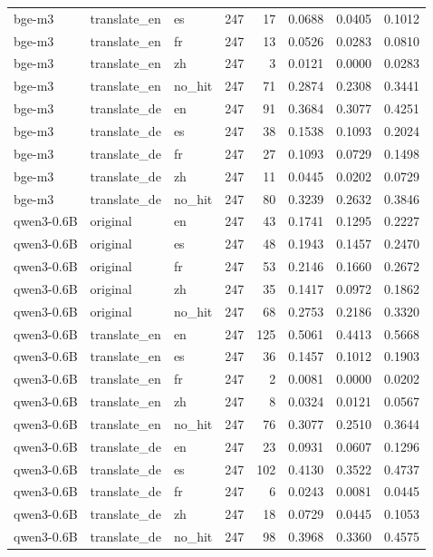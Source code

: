 \begin{tabular}{lllrrrrr}
bge-m3 & translate\_en & es & 247 & 17 & 0.0688 & 0.0405 & 0.1012 \\
bge-m3 & translate\_en & fr & 247 & 13 & 0.0526 & 0.0283 & 0.0810 \\
bge-m3 & translate\_en & zh & 247 & 3 & 0.0121 & 0.0000 & 0.0283 \\
bge-m3 & translate\_en & no\_hit & 247 & 71 & 0.2874 & 0.2308 & 0.3441 \\
bge-m3 & translate\_de & en & 247 & 91 & 0.3684 & 0.3077 & 0.4251 \\
bge-m3 & translate\_de & es & 247 & 38 & 0.1538 & 0.1093 & 0.2024 \\
bge-m3 & translate\_de & fr & 247 & 27 & 0.1093 & 0.0729 & 0.1498 \\
bge-m3 & translate\_de & zh & 247 & 11 & 0.0445 & 0.0202 & 0.0729 \\
bge-m3 & translate\_de & no\_hit & 247 & 80 & 0.3239 & 0.2632 & 0.3846 \\
qwen3-0.6B & original & en & 247 & 43 & 0.1741 & 0.1295 & 0.2227 \\
qwen3-0.6B & original & es & 247 & 48 & 0.1943 & 0.1457 & 0.2470 \\
qwen3-0.6B & original & fr & 247 & 53 & 0.2146 & 0.1660 & 0.2672 \\
qwen3-0.6B & original & zh & 247 & 35 & 0.1417 & 0.0972 & 0.1862 \\
qwen3-0.6B & original & no\_hit & 247 & 68 & 0.2753 & 0.2186 & 0.3320 \\
qwen3-0.6B & translate\_en & en & 247 & 125 & 0.5061 & 0.4413 & 0.5668 \\
qwen3-0.6B & translate\_en & es & 247 & 36 & 0.1457 & 0.1012 & 0.1903 \\
qwen3-0.6B & translate\_en & fr & 247 & 2 & 0.0081 & 0.0000 & 0.0202 \\
qwen3-0.6B & translate\_en & zh & 247 & 8 & 0.0324 & 0.0121 & 0.0567 \\
qwen3-0.6B & translate\_en & no\_hit & 247 & 76 & 0.3077 & 0.2510 & 0.3644 \\
qwen3-0.6B & translate\_de & en & 247 & 23 & 0.0931 & 0.0607 & 0.1296 \\
qwen3-0.6B & translate\_de & es & 247 & 102 & 0.4130 & 0.3522 & 0.4737 \\
qwen3-0.6B & translate\_de & fr & 247 & 6 & 0.0243 & 0.0081 & 0.0445 \\
qwen3-0.6B & translate\_de & zh & 247 & 18 & 0.0729 & 0.0445 & 0.1053 \\
qwen3-0.6B & translate\_de & no\_hit & 247 & 98 & 0.3968 & 0.3360 & 0.4575 \\

\end{tabular}
